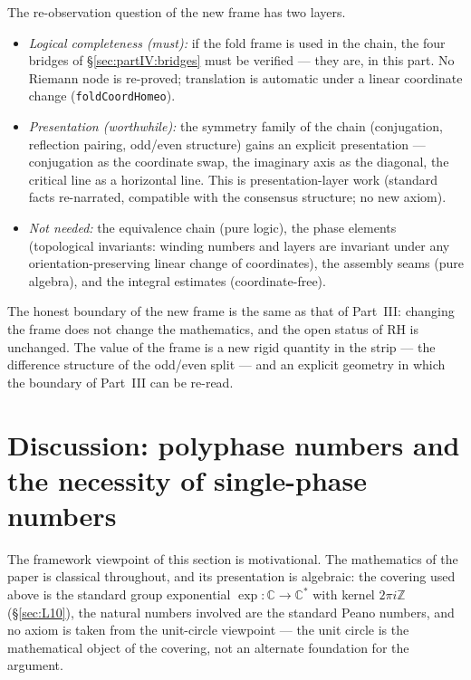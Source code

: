 \documentclass{article}
\begin{document}
The re-observation question of the new frame has two layers.
\begin{itemize}
\item \emph{Logical completeness (must):} if the fold frame is used in
  the chain, the four bridges of \S\ref{sec:partIV:bridges} must be
  verified --- they are, in this part. No Riemann node is re-proved;
  translation is automatic under a linear coordinate change
  (\texttt{foldCoordHomeo}).
\item \emph{Presentation (worthwhile):} the symmetry family of the
  chain (conjugation, reflection pairing, odd/even structure) gains an
  explicit presentation --- conjugation as the coordinate swap, the
  imaginary axis as the diagonal, the critical line as a horizontal
  line. This is presentation-layer work (standard facts re-narrated,
  compatible with the consensus structure; no new axiom).
\item \emph{Not needed:} the equivalence chain (pure logic), the phase
  elements (topological invariants: winding numbers and layers are
  invariant under any orientation-preserving linear change of
  coordinates), the assembly seams (pure algebra), and the integral
  estimates (coordinate-free).
\end{itemize}
The honest boundary of the new frame is the same as that of Part~III:
changing the frame does not change the mathematics, and the open status
of RH is unchanged. The value of the frame is a new rigid quantity in
the strip --- the difference structure of the odd/even split --- and an
explicit geometry in which the boundary of Part~III can be re-read.


\section{Discussion: polyphase numbers and the necessity of single-phase numbers}
\label{sec:discussion}

The framework viewpoint of this section is motivational. The mathematics
of the paper is classical throughout, and its presentation is algebraic:
the covering used above is the standard group exponential
$\exp:\mathbb C\to\mathbb C^*$ with kernel $2\pi i\mathbb Z$
(\S\ref{sec:L10}), the natural numbers involved are the standard Peano
numbers, and no axiom is taken from the unit-circle viewpoint --- the
unit circle is the mathematical object of the covering, not an alternate
foundation for the argument.
\end{document}
